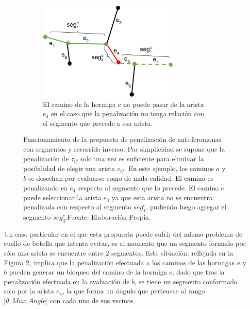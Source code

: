 \begin{figure}[h]
    \begin{subfigure}[t]{\textwidth}
        \centering
        \includegraphics[height=2in]{imagenes/ant_segments_complex_case_block.png}
	    \caption{El camino de la hormiga $c$ no puede pasar de la arista $e_4$ en el caso que la penalizaci\'on no tenga relaci\'on con el segmento que precede a esa arista.}
        \label{fig:segmentComplexCaseBlocked}
    \end{subfigure}
    \caption{Funcionamiento de la propuesta de penalizaci\'on de anti-feromonas con segmentos y recorrido inverso. Por simplicidad se supone que la penalizaci\'on de $\tau_{ij}$ solo una vez es suficiente para eliminar la posibilidad de elegir una arista $c_{ij}$. En este ejemplo, los caminos $a$ y $b$ se desechan por evaluarse como de mala calidad. El camino es penalizando en $e_4$ respecto al segmento que lo precede. El camino $c$ puede seleccionar la arista $e_4$ ya que esta arista no se encuentra penalizada con respecto al segmento $seg^{c}_1$, pudiendo luego agregar el segmento $seg^{c}_3$.Fuente: Elaboraci\'on Propia.}
    \label{fig:segmentComplexCase}
\end{figure}

Un caso particular en el que esta propuesta puede sufrir del mismo problema de cuello de botella que intenta evitar, es al momento que un segmento formado por s\'olo una arista se encuentre entre 2 segmentos. Este situaci\'on, reflejada en la Figura \ref{fig:segmentComplexCase}, implica que la penalizaci\'on efectuada a los caminos de las hormigas $a$ y $b$ pueden generar un bloqueo del camino de la hormiga $c$, dado que tras la penalizaci\'on efectuada en la evaluaci\'on de $b$, se tiene un segmento conformado solo por la arista $e_4$, la que forma un \'angulo que pertenece al rango $]\theta, Max\_Angle]$ con cada uno de sus vecinos.


